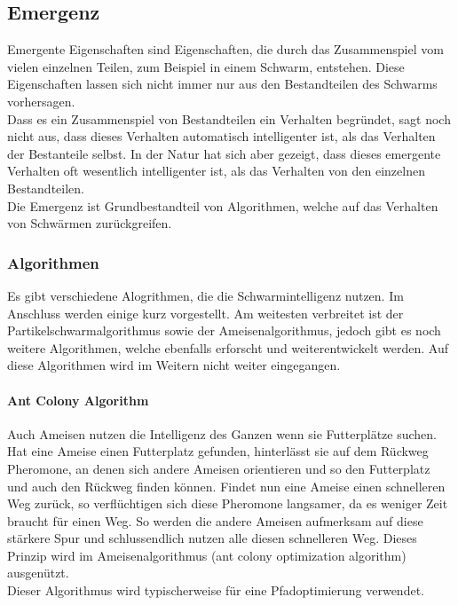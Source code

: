 		\subsection{Emergenz}
		Emergente Eigenschaften sind Eigenschaften, die durch das Zusammenspiel vom vielen einzelnen Teilen, zum Beispiel in einem Schwarm, entstehen. Diese Eigenschaften lassen sich nicht immer nur aus den Bestandteilen des Schwarms vorhersagen. \\
		Dass es ein Zusammenspiel von Bestandteilen ein Verhalten begründet, sagt noch nicht aus, dass dieses Verhalten automatisch intelligenter ist, als das Verhalten der Bestanteile selbst. In der Natur hat sich aber gezeigt, dass dieses emergente Verhalten oft wesentlich intelligenter ist, als das Verhalten von den einzelnen Bestandteilen. \\
		Die Emergenz ist Grundbestandteil von Algorithmen, welche auf das Verhalten von Schwärmen zurückgreifen.\cite{melchior-bsc}
		
		
				
		\subsubsection{Algorithmen}
		Es gibt verschiedene Alogrithmen, die die Schwarmintelligenz nutzen. Im Anschluss werden einige kurz vorgestellt. Am weitesten verbreitet ist der Partikelschwarmalgorithmus sowie der Ameisenalgorithmus, jedoch gibt es noch weitere Algorithmen, welche ebenfalls erforscht und weiterentwickelt werden. Auf diese Algorithmen wird im Weitern nicht weiter eingegangen.\cite{uulm}
		
		\paragraph{Ant Colony Algorithm}
		$\;$ \\
		Auch Ameisen nutzen die Intelligenz des Ganzen wenn sie Futterplätze suchen. Hat eine Ameise einen Futterplatz gefunden, hinterlässt sie auf dem Rückweg Pheromone, an denen sich andere Ameisen orientieren und so den Futterplatz und auch den Rückweg finden können. Findet nun eine Ameise einen schnelleren Weg zurück, so verflüchtigen sich diese Pheromone langsamer, da es weniger Zeit braucht für einen Weg. So werden die andere Ameisen aufmerksam auf diese stärkere Spur und schlussendlich nutzen alle diesen schnelleren Weg. Dieses Prinzip wird im Ameisenalgorithmus (ant colony optimization algorithm) ausgenützt.\\Dieser Algorithmus wird typischerweise für eine Pfadoptimierung verwendet.
		
